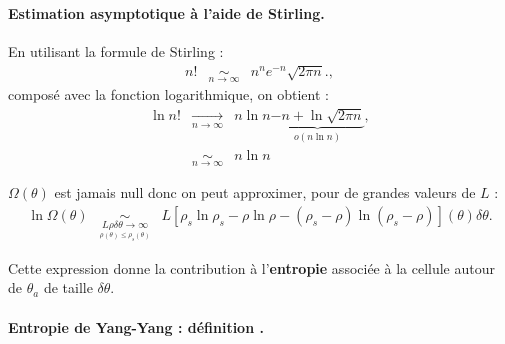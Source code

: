 \paragraph{Estimation asymptotique à l’aide de Stirling.}

En utilisant la formule de Stirling :
\begin{eqnarray}
	n! & \underset{n \to \infty}{\sim} &  n^n e^{-n} \sqrt{2\pi n}.,
\end{eqnarray}	
composé avec la fonction logarithmique, on obtient : 
\begin{eqnarray}
	\ln n! & \underset{n \to \infty}{\rightarrow} & n \ln n \underbrace{- n + \ln \sqrt{2 \pi n }}_{o \left ( n \ln n \right ) } ,\\
	&  \underset{n \to \infty}{\sim} & n \ln n  
\end{eqnarray}
	
$\Omega(\theta)$ est jamais null donc on peut approximer, pour de grandes valeurs de $L$ : 
\begin{eqnarray}
    \ln \Omega(\theta) & \underset{\underset{\rho (\theta )\leq  \rho_s (\theta )}{L\rho \delta \theta  \to \infty}}{\sim}   & L [ \rho_s\ln \rho_s - \rho \ln \rho - (\rho_s - \rho ) \ln ( \rho_s - \rho) ] (\theta )\delta \theta .
\end{eqnarray}

Cette expression donne la contribution  à l’{\bf entropie}  associée à la cellule autour de $\theta_a$ de taille $\delta \theta$.

\paragraph{Entropie de Yang-Yang : définition .}


